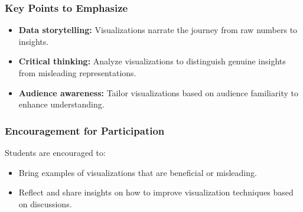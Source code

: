 \documentclass[aspectratio=169]{beamer}
\begin{document}
\begin{frame}[fragile]
  \frametitle{Key Points to Emphasize}
  \begin{itemize}
    \item \textbf{Data storytelling:} Visualizations narrate the journey from raw numbers to insights.
    \item \textbf{Critical thinking:} Analyze visualizations to distinguish genuine insights from misleading representations.
    \item \textbf{Audience awareness:} Tailor visualizations based on audience familiarity to enhance understanding.
  \end{itemize}
\end{frame}

\begin{frame}[fragile]
  \frametitle{Encouragement for Participation}
  Students are encouraged to:
  \begin{itemize}
    \item Bring examples of visualizations that are beneficial or misleading.
    \item Reflect and share insights on how to improve visualization techniques based on discussions.
  \end{itemize}
\end{frame}
\end{document}

